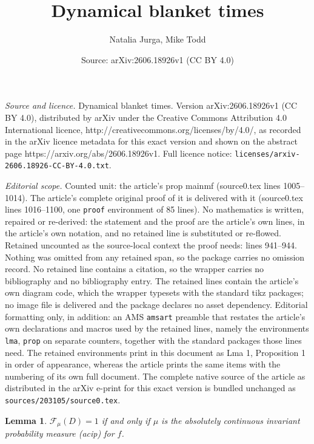 \documentclass[10pt,a4paper]{amsart}
\title{Dynamical blanket times}
\author{Natalia Jurga, Mike Todd}
\date{Source: arXiv:2606.18926v1 (CC BY 4.0)}
\newtheorem{lma}{Lemma}
\begin{document}
\maketitle

\noindent\emph{Source and licence.} Dynamical blanket times. Version arXiv:2606.18926v1 (CC BY 4.0), distributed by arXiv under the Creative Commons Attribution 4.0 International licence, http://creativecommons.org/licenses/by/4.0/, as recorded in the arXiv licence metadata for this exact version and shown on the abstract page https://arxiv.org/abs/2606.18926v1. Full licence notice: \texttt{licenses/arxiv-2606.18926-CC-BY-4.0.txt}.\par\smallskip

\noindent\textit{Editorial scope.} Counted unit: the article's prop mainmf (source0.tex lines 1005--1014). The article's complete original proof of it is delivered with it (source0.tex lines 1016--1100, one \texttt{proof} environment of 85 lines). No mathematics is written, repaired or re-derived: the statement and the proof are the article's own lines, in the article's own notation, and no retained line is substituted or re-flowed.  Retained uncounted as the source-local context the proof needs: lines 941--944.  Nothing was omitted from any retained span, so the package carries no omission record.  No retained line contains a citation, so the wrapper carries no bibliography and no bibliography entry.  The retained lines contain the article's own diagram code, which the wrapper typesets with the standard tikz packages; no image file is delivered and the package declares no asset dependency.  Editorial formatting only, in addition: an AMS \texttt{amsart} preamble that restates the article's own declarations and macros used by the retained lines, namely the environments \texttt{lma}, \texttt{prop} on separate counters, together with the standard packages those lines need.  The retained environments print in this document as Lma 1, Proposition 1 in order of appearance, whereas the article prints the same items with the numbering of its own full document.  The complete native source of the article as distributed in the arXiv e-print for this exact version is bundled unchanged as \texttt{sources/203105/source0.tex}.
\begin{lma}\label{mfacip}
$\mathcal{F}_\mu(D)=1$ if and only if $\mu$ is the absolutely continuous
invariant probability measure (acip) for $f$.
\end{lma}
\end{document}
